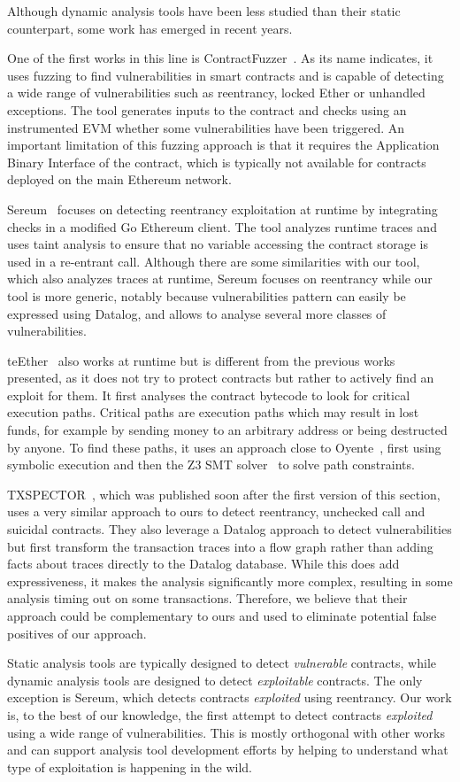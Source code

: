 Although dynamic analysis tools have been less studied than their static counterpart, some work has emerged in recent years.

One of the first works in this line is ContractFuzzer~\cite{Jiang2018}.
As its name indicates, it uses fuzzing to find vulnerabilities in smart contracts and is capable of detecting a wide range of vulnerabilities such as reentrancy, locked Ether or unhandled exceptions.
The tool generates inputs to the contract and checks using an instrumented EVM whether some vulnerabilities have been triggered.
An important limitation of this fuzzing approach is that it requires the Application Binary Interface of the contract, which is typically not available for contracts deployed on the main Ethereum network.

Sereum~\cite{Rodler2019} focuses on detecting reentrancy exploitation at runtime by integrating checks in a modified Go Ethereum client.
The tool analyzes runtime traces and uses taint analysis to ensure that no variable accessing the contract storage is used in a re-entrant call.
Although there are some similarities with our tool, which also analyzes traces at runtime, Sereum focuses on reentrancy while our tool is more generic, notably because vulnerabilities pattern can easily be expressed using Datalog, and allows to analyse several more classes of vulnerabilities.

teEther~\cite{Krupp2018} also works at runtime but is different from the previous works presented, as it does not try to protect contracts but rather to actively find an exploit for them. It first analyses the contract bytecode to look for critical execution paths.
Critical paths are execution paths which may result in lost funds, for example by sending money to an arbitrary address or being destructed by anyone.
To find these paths, it uses an approach close to Oyente~\cite{Luu2016a}, first using symbolic execution and then the Z3 SMT solver~\cite{de2008z3} to solve path constraints.

TXSPECTOR~\cite{255340}, which was published soon after the first version of this section, uses a very similar approach to ours to detect reentrancy, unchecked call and suicidal contracts.
They also leverage a Datalog approach to detect vulnerabilities but first transform the transaction traces into a flow graph rather than adding facts about traces directly to the Datalog database.
While this does add expressiveness, it makes the analysis significantly more complex, resulting in some analysis timing out on some transactions. Therefore, we believe that their approach could be complementary to ours and used to eliminate potential false positives of our approach.

 Static analysis tools are typically designed to detect \emph{vulnerable} contracts, while dynamic analysis tools are designed to detect \emph{exploitable} contracts. The only exception is Sereum, which detects contracts \emph{exploited} using reentrancy.
Our work is, to the best of our knowledge, the first attempt to detect contracts \emph{exploited} using a wide range of vulnerabilities.
This is mostly orthogonal with other works and can support analysis tool development efforts by helping to understand what type of exploitation is happening in the wild.
